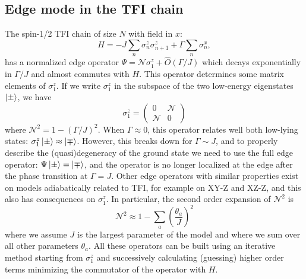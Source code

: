 \documentclass[12pt]{report}
\newcommand{\B}{\Gamma}
\newcommand{\s}{\sigma}
\newcommand{\Nz}{\mathcal{N}}
\begin{document}
\subsection*{Edge mode in the TFI chain}
The spin-1/2 TFI chain of size $N$ with field in $x$:
%
\begin{equation*}
H = -J\sum_{n} \s^z_n \s^z_{n+1} + \B\sum_{n} \s^x_n,
\end{equation*}
%
has a normalized edge operator $\Psi = \Nz\s_1^z + \hat{O}(\B/J)$ which decays exponentially in $\B/J$ and almost commutes with $H$. This operator determines some matrix elements of $\s_1^z$. If we write $\s_1^z$ in the subspace of the two low-energy eigenstates $\ket{\pm}$, we have
%
\begin{equation}
\s_1^z =
\left(\begin{matrix}
0 & \Nz\\
\Nz & 0
\end{matrix}\right)
\end{equation}
%
where $\Nz^2 = 1 - (\B/J)^2$. When $\B \approx 0$, this operator relates well both low-lying states: $\s_1^z\ket{\pm} \approx \ket{\mp}$. However, this breaks down for $\B \sim J$, and to properly describe the (quasi)degeneracy of the ground state we need to use the full edge operator: $\Psi\ket{\pm} = \ket{\mp}$, and the operator is no longer localized at the edge after the phase transition at $\B = J$. Other edge operators with similar properties exist on models adiabatically related to TFI, for example on XY-Z and XZ-Z, and this also has consequences on $\s_1^z$. In particular, the second order expansion of $\Nz^2$ is
%
\begin{equation}
\Nz^2 \approx 1 - \sum_a \left( \frac{\theta_a}{J} \right)^2
\end{equation}
%
where we assume $J$ is the largest parameter of the model and where we sum over all other parameters $\theta_a$. All these operators can be built using an iterative method starting from $\s_1^z$ and successively calculating (guessing) higher order terms minimizing the commutator of the operator with $H$.
\end{document}
